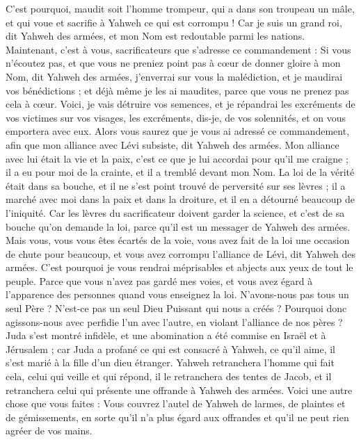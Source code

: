 \begin{multicols}{2}
C'est pourquoi, maudit soit l'homme trompeur, qui a dans son troupeau un mâle, et qui voue et sacrifie à Yahweh ce qui est corrompu ! Car je suis un grand roi, dit Yahweh des armées, et mon Nom est redoutable parmi les nations.
\VerseOne{}Maintenant, c’est à vous, sacrificateurs que s'adresse ce commandement :
Si vous n'écoutez pas, et que vous ne preniez point pas à cœur de donner gloire à mon Nom, dit Yahweh des armées, j'enverrai sur vous la malédiction, et je maudirai vos bénédictions ; et déjà même je les ai maudites, parce que vous ne prenez pas cela à cœur.
Voici, je vais détruire vos semences, et je répandrai les excréments de vos victimes sur vos visages, les excréments, dis-je, de vos solennités, et on vous emportera avec eux.
Alors vous saurez que je vous ai adressé ce commandement, afin que mon alliance avec Lévi subsiste, dit Yahweh des armées.
Mon alliance avec lui était la vie et la paix, c’est ce que je lui accordai pour qu’il me craigne ; il a eu pour moi de la crainte, et il a tremblé devant mon Nom.
La loi de la vérité était dans sa bouche, et il ne s'est point trouvé de perversité sur ses lèvres ; il a marché avec moi dans la paix et dans la droiture, et il en a détourné beaucoup de l'iniquité.
Car les lèvres du sacrificateur doivent garder la science, et c’est de sa bouche qu’on demande la loi, parce qu'il est un messager de Yahweh des armées.
Mais vous, vous vous êtes écartés de la voie, vous avez fait de la loi une occasion de chute pour beaucoup, et vous avez corrompu l'alliance de Lévi, dit Yahweh des armées.
C'est pourquoi je vous rendrai méprisables et abjects aux yeux de tout le peuple. Parce que vous n’avez pas gardé mes voies, et vous avez égard à l'apparence des personnes quand vous enseignez la loi.
N'avons-nous pas tous un seul Père ? N’est-ce pas un seul Dieu Puissant qui nous a créés ? Pourquoi donc agissons-nous avec perfidie l’un avec l’autre, en violant l'alliance de nos pères ?
Juda s’est montré infidèle, et une abomination a été commise en Israël et à Jérusalem ; car Juda a profané ce qui est consacré à Yahweh, ce qu’il aime, il s'est marié à la fille d'un dieu étranger.
Yahweh retranchera l’homme qui fait cela, celui qui veille et qui répond, il le retranchera des tentes de Jacob, et il retranchera celui qui présente une offrande à Yahweh des armées.
Voici une autre chose que vous faites : Vous couvrez l'autel de Yahweh de larmes, de plaintes et de gémissements, en sorte qu’il n’a plus égard aux offrandes et qu’il ne peut rien agréer de vos mains.

\end{multicols}
